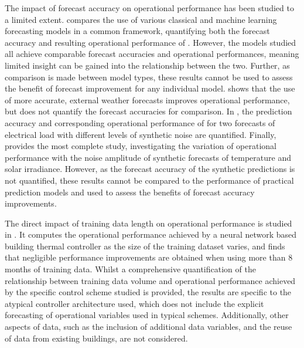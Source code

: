 The impact of forecast accuracy on  operational performance has been studied to a limited extent. \citep{erfani2021AnalysisImpactPredictive} compares the use of various classical and machine learning forecasting models in a common  framework, quantifying both the forecast accuracy and resulting operational performance of . However, the models studied all achieve comparable forecast accuracies and operational performances, meaning limited insight can be gained into the relationship between the two. Further, as comparison is made between model types, these results cannot be used to assess the benefit of forecast improvement for any individual model.
\citep{oldewurtel2012UseModelPredictive} shows that the use of more accurate, external weather forecasts improves  operational performance, but does not quantify the forecast accuracies for comparison. In \citep{bartolucci2019HybridRenewableEnergy}, the prediction accuracy and corresponding operational performance of  for two forecasts of electrical load with different levels of synthetic noise are quantified. Finally, \citep{enriquez2016SolarForecastingRequirements} provides the most complete study, investigating the variation of operational performance with the noise amplitude of synthetic forecasts of temperature and solar irradiance. However, as the forecast accuracy of the synthetic predictions is not quantified, these results cannot be compared to the performance of practical prediction models and used to assess the benefits of forecast accuracy improvements.

The direct impact of training data length on operational performance is studied in \citep{savadkoohi2023FacilitatingImplementationNeural}. It computes the operational performance achieved by a neural network based building thermal controller as the size of the training dataset varies, and finds that negligible performance improvements are obtained when using more than 8 months of training data. Whilst a comprehensive quantification of the relationship between training data volume and operational performance achieved by the specific control scheme studied is provided, the results are specific to the atypical controller architecture used, which does not include the explicit forecasting of operational variables used in typical  schemes. Additionally, other aspects of data, such as the inclusion of additional data variables, and the reuse of data from existing buildings, are not considered.\\

